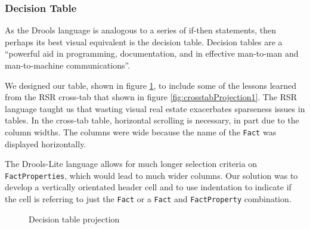 \subsubsection{Decision Table}

As the Drools language is analogous to a series of if-then statements, then perhaps its best visual equivalent is the decision table.
Decision tables are a ``powerful aid in programming, documentation, and in effective man-to-man and man-to-machine communications''\cite{pooch1974translation}.

We designed our table, shown in figure \ref{fig:decisionTableProjection}, to include some of the lessons learned from the RSR cross-tab that shown in figure \ref{fig:crosstabProjection1}.
The RSR language taught us that wasting visual real estate exacerbates sparseness issues in tables.
In the cross-tab table, horizontal scrolling is necessary, in part due to the column widths.
The columns were wide because the name of the \texttt{Fact} was displayed horizontally.

The Drools-Lite language allows for much longer selection criteria on \texttt{FactProperties}, which would lead to much wider columns.
Our solution was to develop a vertically orientated header cell and to use indentation to indicate if the cell is referring to just the \texttt{Fact} or a \texttt{Fact} and \texttt{FactProperty} combination.

\begin{figure}[h]
    \centering
    \caption{Decision table projection}
    \label{fig:decisionTableProjection}
\end{figure}

